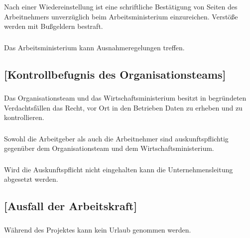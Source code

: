 \documentclass[a4paper, 11pt]{report}
\let\oldsubsection\subsection
\renewcommand{\subsection}{\leftskip=40pt\oldsubsection}
\begin{document}
 
\subsubsection{}
Nach einer Wiedereinstellung ist eine schriftliche Bestätigung von Seiten des Arbeitnehmers unverzüglich beim Arbeitsministerium einzureichen. Verstöße werden mit Bußgeldern bestraft.

\subsubsection{}
Das Arbeitsministerium kann Ausnahmeregelungen treffen. 

 

\subsection{[Kontrollbefugnis des Organisationsteams]}

 
\subsubsection{}
Das Organisationsteam und das Wirtschaftsministerium besitzt in begründeten Verdachtsfällen das Recht, vor Ort in den Betrieben Daten zu erheben und zu kontrollieren. 

\subsubsection{}
Sowohl die Arbeitgeber als auch die Arbeitnehmer sind auskunftspflichtig gegenüber dem Organisationsteam und dem Wirtschaftsministerium. 

\subsubsection{}
Wird die Auskunftspflicht nicht eingehalten kann die Unternehmensleitung abgesetzt werden. 
    
    
    
\subsection{[Ausfall der Arbeitskraft]}

 
\subsubsection{}
Während des Projektes kann kein Urlaub genommen werden. 
\end{document}
